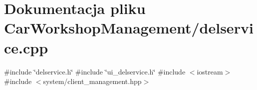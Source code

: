 \section{Dokumentacja pliku Car\+Workshop\+Management/delservice.cpp}
\label{delservice_8cpp}
{\ttfamily \#include \char`\"{}delservice.\+h\char`\"{}}\newline
{\ttfamily \#include \char`\"{}ui\+\_\+delservice.\+h\char`\"{}}\newline
{\ttfamily \#include $<$iostream$>$}\newline
{\ttfamily \#include $<$system/client\+\_\+management.\+hpp$>$}\newline
